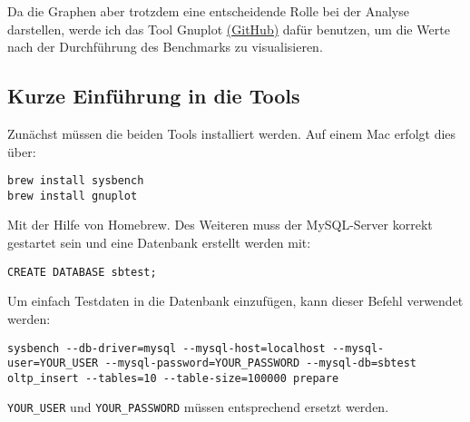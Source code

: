 Da die Graphen aber trotzdem eine entscheidende Rolle bei der Analyse darstellen, werde ich das Tool Gnuplot \href{https://github.com/gnuplot/gnuplot}{(GitHub)} dafür benutzen, um die Werte nach der Durchführung des Benchmarks zu visualisieren.

\subsection{Kurze Einführung in die Tools}\label{sec:kurze-einfuhrung-in-die-tools}

Zunächst müssen die beiden Tools installiert werden.
Auf einem Mac erfolgt dies über:

\begin{lstlisting}[label={lst:install tools}]
brew install sysbench
brew install gnuplot
\end{lstlisting}

Mit der Hilfe von Homebrew.
Des Weiteren muss der MySQL-Server korrekt gestartet sein und eine Datenbank erstellt werden mit:

\begin{lstlisting}[label={lst:create databse}]
CREATE DATABASE sbtest;
\end{lstlisting}

Um einfach Testdaten in die Datenbank einzufügen, kann dieser Befehl verwendet werden:

\begin{lstlisting}[style=custom_daniel,label={lst:sysbenchrun}]
sysbench --db-driver=mysql --mysql-host=localhost --mysql-user=YOUR_USER --mysql-password=YOUR_PASSWORD --mysql-db=sbtest oltp_insert --tables=10 --table-size=100000 prepare
\end{lstlisting}

\texttt{YOUR\_USER} und \texttt{YOUR\_PASSWORD} müssen entsprechend ersetzt werden.




